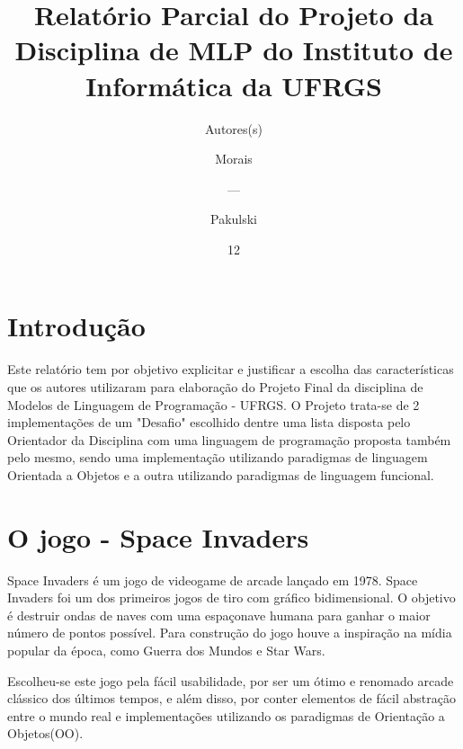 \documentclass[rel_mlp]{iiufrgs}
\title{Relatório Parcial do Projeto da Disciplina de MLP do Instituto de Informática da UFRGS}
\author{Autores(s)}{Aluno(s)} %
\author{Morais}{Bruno} %
\author{---}{---}       %
\author{Pakulski}{Gabriel}
\date{12}{2018}
\begin{document}
\maketitle      









%
\chapter{Introdução} \label{intro}

Este relatório tem por objetivo explicitar e justificar a escolha das características que os autores utilizaram para elaboração do Projeto Final da disciplina de Modelos de Linguagem de Programação - UFRGS. O Projeto trata-se de 2 implementações de um "Desafio" escolhido dentre uma lista disposta pelo Orientador da Disciplina com uma linguagem de programação proposta também pelo mesmo, sendo uma implementação utilizando paradigmas de linguagem Orientada a Objetos e a outra utilizando paradigmas de linguagem funcional.


%
\chapter{O jogo - Space Invaders}


Space Invaders é um jogo de videogame de arcade lançado em 1978. Space Invaders foi um dos primeiros jogos de tiro com gráfico bidimensional. O objetivo é destruir ondas de naves com uma espaçonave humana para ganhar o maior número de pontos possível. Para construção do jogo houve a inspiração na mídia popular da época, como Guerra dos Mundos e Star Wars.

Escolheu-se este jogo pela fácil usabilidade, por ser um ótimo e renomado arcade clássico dos últimos tempos, e além disso, por conter elementos de fácil abstração entre o mundo real e implementações utilizando os paradigmas de Orientação a Objetos(OO).
\end{document}
